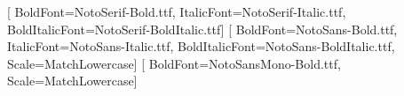 \usepackage{microtype}
\usepackage{newunicodechar}
\setmainfont{NotoSerif-Regular.ttf}[
  BoldFont=NotoSerif-Bold.ttf,
  ItalicFont=NotoSerif-Italic.ttf,
  BoldItalicFont=NotoSerif-BoldItalic.ttf]
\setsansfont{NotoSans-Regular.ttf}[
  BoldFont=NotoSans-Bold.ttf,
  ItalicFont=NotoSans-Italic.ttf,
  BoldItalicFont=NotoSans-BoldItalic.ttf,
  Scale=MatchLowercase]
\setmonofont{NotoSansMono-Regular.ttf}[
  BoldFont=NotoSansMono-Bold.ttf,
  Scale=MatchLowercase]
\usepackage{fancyhdr}
\usepackage{xcolor}
\usepackage{titlesec}
\usepackage{titling}
\usepackage{fvextra}
\usepackage{xurl}
\usepackage{caption}
\usepackage{enumitem}
\usepackage{needspace}
\usepackage[section]{placeins}
\usepackage{etoolbox}


\linespread{0.96}
\setlength{\parindent}{0pt}
\setlength{\parskip}{0.44em plus 0.08em minus 0.04em}
\setlength{\emergencystretch}{3em}

